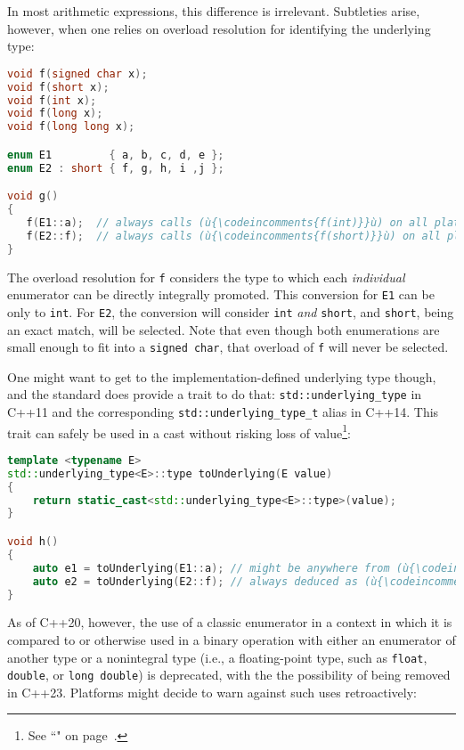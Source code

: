 In most arithmetic expressions, this difference is irrelevant.
Subtleties arise, however, when one relies on overload resolution for
identifying the underlying type:

\begin{lstlisting}[language=C++]
void f(signed char x);
void f(short x);
void f(int x);
void f(long x);
void f(long long x);

enum E1         { a, b, c, d, e };
enum E2 : short { f, g, h, i ,j };

void g()
{
   f(E1::a);  // always calls (ù{\codeincomments{f(int)}}ù) on all platforms
   f(E2::f);  // always calls (ù{\codeincomments{f(short)}}ù) on all platforms
}
\end{lstlisting}
    
\noindent The overload resolution for \texttt{f} considers the type to which each
\emph{individual} enumerator can be directly integrally promoted. This
conversion for \texttt{E1} can be only to \texttt{int}. For \texttt{E2},
the conversion will consider \texttt{int} \emph{and} \texttt{short}, and
\texttt{short}, being an exact match, will be selected. Note that even
though both enumerations are small enough to fit into a
\texttt{signed}~\texttt{char}, that overload of \texttt{f} will never be
selected.

One might want to get to the implementation-defined underlying type
though, and the standard does provide a trait to do that:
\texttt{std::underlying\_type} in C++11 and the corresponding
\texttt{std::underlying\_type\_t} alias in C++14. This trait can safely
be used in a cast without risking loss of value{\cprotect\footnote{See
  ``" on page~\pageref{auto}.}}:

\begin{lstlisting}[language=C++]
template <typename E>
std::underlying_type<E>::type toUnderlying(E value)
{
    return static_cast<std::underlying_type<E>::type>(value);
}

void h()
{
    auto e1 = toUnderlying(E1::a); // might be anywhere from (ù{\codeincomments{signed char}}ù) to (ù{\codeincomments{int}}ù)
    auto e2 = toUnderlying(E2::f); // always deduced as (ù{\codeincomments{short}}ù)
}
\end{lstlisting}
    
\noindent As of C++20, however, the use of a classic enumerator in a context in
which it is compared to or otherwise used in a binary operation with
either an enumerator of another type or a nonintegral type (i.e., a
floating-point type, such as \texttt{float}, \texttt{double}, or
\texttt{long}~\texttt{double}) is deprecated, with the the possibility
of being removed in C++23. Platforms might decide to warn against such
uses retroactively:

